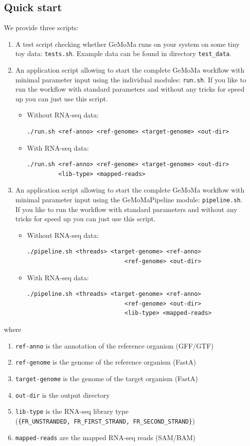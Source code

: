 \documentclass{article}
\begin{document}
\subsection{Quick start}
We provide three scripts:
\begin{enumerate}
	\item A test script checking whether GeMoMa runs on your system on some tiny toy data: \texttt{tests.sh}. Example data can be found in directory \texttt{test\_data}.
	\item An application script allowing to start the complete GeMoMa workflow with minimal parameter input using the individual modules: \texttt{run.sh}. If you like to run the workflow with standard parameters and without any tricks for speed up you can just use this script.
\begin{itemize}
	\item Without RNA-seq data:
\begin{verbatim}
./run.sh <ref-anno> <ref-genome> <target-genome> <out-dir>
\end{verbatim}	
	\item With RNA-seq data:
\begin{verbatim}
./run.sh <ref-anno> <ref-genome> <target-genome> <out-dir>
         <lib-type> <mapped-reads>
\end{verbatim}
\end{itemize}
	\item An application script allowing to start the complete GeMoMa workflow with minimal parameter input using the GeMoMaPipeline module: \texttt{pipeline.sh}. If you like to run the workflow with standard parameters and without any tricks for speed up you can just use this script.
\begin{itemize}
	\item Without RNA-seq data:
\begin{verbatim}
./pipeline.sh <threads> <target-genome> <ref-anno>
							<ref-genome> <out-dir>
\end{verbatim}	
	\item With RNA-seq data:
\begin{verbatim}
./pipeline.sh <threads> <target-genome> <ref-anno>
							<ref-genome> <out-dir>
							<lib-type> <mapped-reads>
\end{verbatim}
\end{itemize}
\end{enumerate}
where
\begin{enumerate}
	\item \texttt{ref-anno} is the annotation of the reference organism (GFF/GTF)
	\item \texttt{ref-genome} is the genome of the reference organism (FastA)
	\item \texttt{target-genome} is the genome of the target organism (FastA)
	\item \texttt{out-dir} is the output directory
	\item \texttt{lib-type} is the RNA-seq library type\\
		(\verb"{FR_UNSTRANDED, FR_FIRST_STRAND, FR_SECOND_STRAND}")
	\item \texttt{mapped-reads} are the mapped RNA-seq reads (SAM/BAM)
\end{enumerate}
\end{document}
